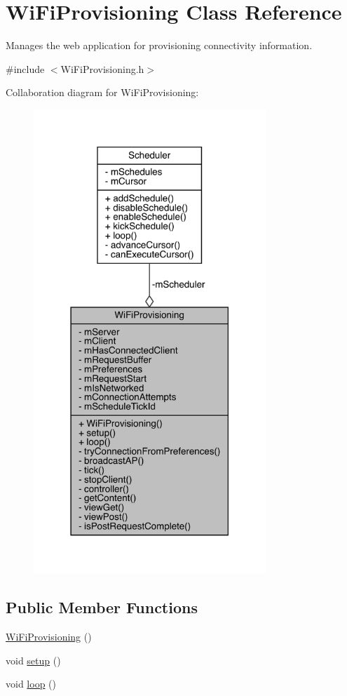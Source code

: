\hypertarget{class_wi_fi_provisioning}{}\section{Wi\+Fi\+Provisioning Class Reference}
\label{class_wi_fi_provisioning}


Manages the web application for provisioning connectivity information.  




{\ttfamily \#include $<$Wi\+Fi\+Provisioning.\+h$>$}



Collaboration diagram for Wi\+Fi\+Provisioning\+:\nopagebreak
\begin{figure}[H]
\begin{center}
\leavevmode
\includegraphics[width=248pt]{class_wi_fi_provisioning__coll__graph}
\end{center}
\end{figure}
\subsection*{Public Member Functions}
\begin{DoxyCompactItemize}
\item 
\mbox{\hyperlink{class_wi_fi_provisioning_afbbef380855199c9b26fbd8c57c3b6e1}{Wi\+Fi\+Provisioning}} ()
\item 
void \mbox{\hyperlink{class_wi_fi_provisioning_a82297da1523e801f8173337091bb72ee}{setup}} ()
\item 
void \mbox{\hyperlink{class_wi_fi_provisioning_afe176c8aa10c718471ea8608d335d1c4}{loop}} ()
\end{DoxyCompactItemize}
